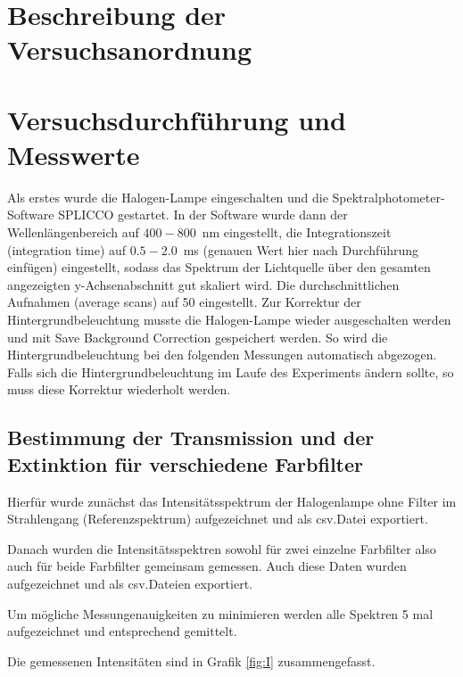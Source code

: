 \documentclass{article}
\begin{document}
\section{Beschreibung der Versuchsanordnung}

\section{Versuchsdurchführung und Messwerte}

Als erstes wurde die Halogen-Lampe eingeschalten und die Spektralphotometer-Software SPLICCO gestartet. In der Software wurde dann der Wellenlängenbereich auf $400-800$~nm eingestellt, die Integrationszeit (integration time) auf $0.5-2.0$~ms (genauen Wert hier nach Durchführung einfügen) eingestellt, sodass das Spektrum der Lichtquelle über den gesamten angezeigten y-Achsenabschnitt gut skaliert wird. Die durchschnittlichen Aufnahmen (average scans) auf 50 eingestellt.
Zur Korrektur der Hintergrundbeleuchtung musste die Halogen-Lampe wieder ausgeschalten werden und mit Save Background Correction gespeichert werden. So wird die Hintergrundbeleuchtung bei den folgenden Messungen automatisch abgezogen. Falls sich die Hintergrundbeleuchtung im Laufe des Experiments ändern sollte, so muss diese Korrektur wiederholt werden.


\subsection{Bestimmung der Transmission und der Extinktion für verschiedene Farbfilter}

Hierfür wurde zunächst das Intensitätsspektrum der Halogenlampe ohne Filter im Strahlengang (Referenzspektrum) aufgezeichnet und als csv.Datei exportiert.

Danach wurden die Intensitätsspektren sowohl für zwei einzelne Farbfilter also auch für beide Farbfilter gemeinsam gemessen. Auch diese Daten wurden aufgezeichnet und als csv.Dateien exportiert.

Um mögliche Messungenauigkeiten zu minimieren werden alle Spektren 5 mal aufgezeichnet und entsprechend gemittelt.

Die gemessenen Intensitäten sind in Grafik \ref{fig:I} zusammengefasst.
\end{document}
